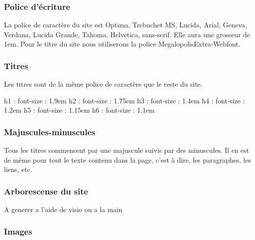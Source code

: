 \documentclass[letter, 10pt]{report}
\begin{document}
\subsubsection{Police d’écriture}

La police de caractère du site est Optima, Trebuchet MS, Lucida, Arial, Geneva, Verdana, Lucida Grande, Tahoma, Helvetica, sans-serif. Elle aura une grosseur de 1em. Pour le titre du site nous utiliserons la police MegalopolisExtra-Webfont.

\subsubsection{Titres}

Les titres sont de la même police de caractère que le reste du site.

h1 : font-size : 1.9em
h2 : font-size : 1.75em
h3 : font-size : 1.4em
h4 : font-size : 1.2em
h5 : font-size : 1.15em
h6 : font-size : 1.1em

\subsubsection{Majuscules-minuscules}

Tous les titres commencent par une majuscule suivis par des minuscules. Il en est de même pour tout le texte contenu dans la page, c'est à dire, les paragraphes, les liens, etc.

\subsubsection{Arborescense du site}

A generer a l'aide de visio ou a la main

\subsubsection{Images}
\end{document}
